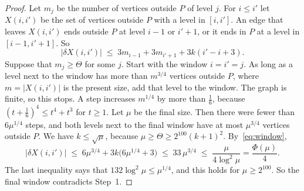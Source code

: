 \begin{proof}
 Let $m_j$ be the number of vertices outside $P$ of level $j$.
For $i\le i'$ let $X(i,i')$ be the set of vertices outside $P$ with a level in $[i,i']$. An edge
that leaves $X(i,i')$ ends outside $P$ at level $i-1$ or $i'+1$, or it ends in $P$ at a level in
$[i-1,i'+1]$. So
\begin{equation}\label{eq:window}
  |\delta X(i,i')|\;\le\;3m_{i-1}+3m_{i'+1}+3k(i'-i+3).
\end{equation}
Suppose that $m_j\ge\Theta$ for some $j$. Start with the window $i=i'=j$. As long as a level next
to the window has more than $m^{3/4}$ vertices outside $P$, where $m=|X(i,i')|$ is the present
size, add that level to the window. The graph is finite, so this stops. A step increases
$m^{1/4}$ by more than $\frac16$, because $(t+\frac16)^{4}\le t^{4}+t^{3}$ for $t\ge1$. Let $\mu$
be the final size. Then there were fewer than $6\mu^{1/4}$ steps, and both levels next to the
final window have at most $\mu^{3/4}$ vertices outside $P$. We have $k\le\sqrt\mu$, because
$\mu\ge\Theta\ge2^{100}(k+1)^{2}$. By~\eqref{eq:window},
\[
  |\delta X(i,i')|\;\le\;6\mu^{3/4}+3k\bigl(6\mu^{1/4}+3\bigr)\;\le\;33\,\mu^{3/4}
  \;\le\;\frac{\mu}{4\log^{2}\mu}=\frac{\Phi(\mu)}4 .
\]
The last inequality says that $132\log^{2}\mu\le\mu^{1/4}$, and this holds for
$\mu\ge2^{100}$. So the final window contradicts Step~1.
\end{proof}


